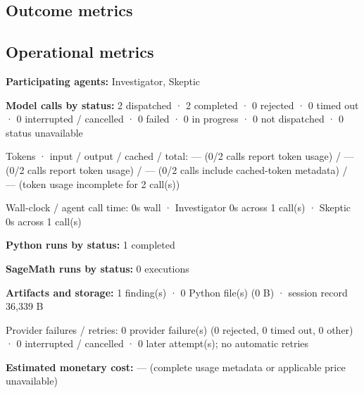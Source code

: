 \documentclass[11pt]{article}
\begin{document}
\subsection{Outcome metrics}
\subsection{Operational metrics}
\textbf{Participating agents:} Investigator, Skeptic\par
\textbf{Model calls by status:} 2 dispatched · 2 completed · 0 rejected · 0 timed out · 0 interrupted / cancelled · 0 failed · 0 in progress · 0 not dispatched · 0 status unavailable\par
Tokens · input / output / cached / total: — (0/2 calls report token usage) / — (0/2 calls report token usage) / — (0/2 calls include cached-token metadata) / — (token usage incomplete for 2 call(s))\par
Wall-clock / agent call time: 0s wall · Investigator 0s across 1 call(s) · Skeptic 0s across 1 call(s)\par
\textbf{Python runs by status:} 1 completed\par
\textbf{SageMath runs by status:} 0 executions\par
\textbf{Artifacts and storage:} 1 finding(s) · 0 Python file(s) (0 B) · session record 36,339 B\par
Provider failures / retries: 0 provider failure(s) (0 rejected, 0 timed out, 0 other) · 0 interrupted / cancelled · 0 later attempt(s); no automatic retries\par
\textbf{Estimated monetary cost:} — (complete usage metadata or applicable price unavailable)\par
\end{document}
